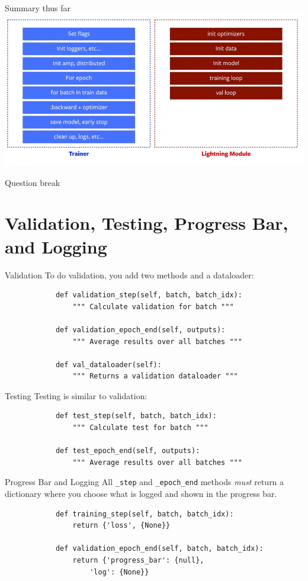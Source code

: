 \documentclass[aspectratio=169]{beamer}
\begin{document}
	\begin{frame}{Summary thus far}
		\centering
		\includegraphics[height=0.7\textheight]{research_engineering.png}
	\end{frame}

	\begin{frame}[standout]
		\LARGE Question break
	\end{frame}

	\section{Validation, Testing, Progress Bar, and Logging}

	\begin{frame}[fragile]{Validation}
		To do validation, you add two methods and a dataloader:
		\begin{verbatim}
			def validation_step(self, batch, batch_idx):
				""" Calculate validation for batch """

			def validation_epoch_end(self, outputs):
				""" Average results over all batches """

			def val_dataloader(self):
				""" Returns a validation dataloader """
		\end{verbatim}
		\vfill
	\end{frame}

	\begin{frame}[fragile]{Testing}
		Testing is similar to validation:
		\begin{verbatim}
			def test_step(self, batch, batch_idx):
				""" Calculate test for batch """

			def test_epoch_end(self, outputs):
				""" Average results over all batches """
		\end{verbatim}
	\end{frame}

	\begin{frame}[fragile]{Progress Bar and Logging}
		All \texttt{\_step} and \texttt{\_epoch\_end} methods \emph{must} return a dictionary where you choose what is logged and shown in the progress bar.
		\begin{verbatim}
			def training_step(self, batch, batch_idx):
				return {'loss', {None}}

			def validation_epoch_end(self, batch, batch_idx):
				return {'progress_bar': {null},
					'log': {None}}
		\end{verbatim}
	\end{frame}
\end{document}
